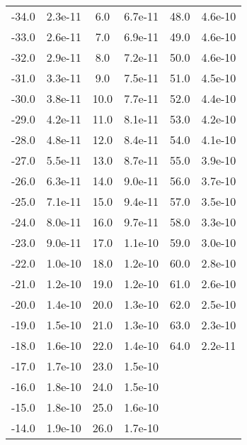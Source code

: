 \begin{table}[!]
\begin{tabular}{cc|cc|cc}
       -34.0 &  2.3e-11 &         6.0 &  6.7e-11 &        48.0 &  4.6e-10 \\
       -33.0 &  2.6e-11 &         7.0 &  6.9e-11 &        49.0 &  4.6e-10 \\
       -32.0 &  2.9e-11 &         8.0 &  7.2e-11 &        50.0 &  4.6e-10 \\
       -31.0 &  3.3e-11 &         9.0 &  7.5e-11 &        51.0 &  4.5e-10 \\
       -30.0 &  3.8e-11 &        10.0 &  7.7e-11 &        52.0 &  4.4e-10 \\
       -29.0 &  4.2e-11 &        11.0 &  8.1e-11 &        53.0 &  4.2e-10 \\
       -28.0 &  4.8e-11 &        12.0 &  8.4e-11 &        54.0 &  4.1e-10 \\
       -27.0 &  5.5e-11 &        13.0 &  8.7e-11 &        55.0 &  3.9e-10 \\
       -26.0 &  6.3e-11 &        14.0 &  9.0e-11 &        56.0 &  3.7e-10 \\
       -25.0 &  7.1e-11 &        15.0 &  9.4e-11 &        57.0 &  3.5e-10 \\
       -24.0 &  8.0e-11 &        16.0 &  9.7e-11 &        58.0 &  3.3e-10 \\
       -23.0 &  9.0e-11 &        17.0 &  1.1e-10 &        59.0 &  3.0e-10 \\
       -22.0 &  1.0e-10 &        18.0 &  1.2e-10 &        60.0 &  2.8e-10 \\
       -21.0 &  1.2e-10 &        19.0 &  1.2e-10 &        61.0 &  2.6e-10 \\
       -20.0 &  1.4e-10 &        20.0 &  1.3e-10 &       62.0  &  2.5e-10 \\
       -19.0 &  1.5e-10 &        21.0 &  1.3e-10 &        63.0 &  2.3e-10 \\
       -18.0 &  1.6e-10 &        22.0 &  1.4e-10 &        64.0 &  2.2e-11 \\
       -17.0 &  1.7e-10 &        23.0 &  1.5e-10 &  & \\
       -16.0 &  1.8e-10 &        24.0 &  1.5e-10 &  & \\
       -15.0 &  1.8e-10 &        25.0 &  1.6e-10 &  & \\
       -14.0 &  1.9e-10 &        26.0 &  1.7e-10 &  &
\end{tabular}
\end{table}
